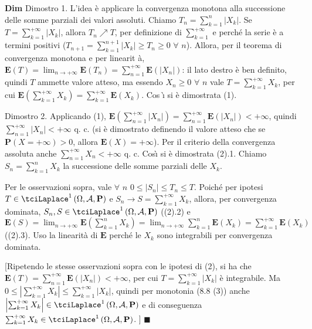 \documentclass{article}
\begin{document}
\textbf{Dim} Dimostro 1. L'idea \`{e} applicare la convergenza monotona alla
successione delle somme parziali dei valori assoluti. Chiamo $%
T_{n}=\sum_{k=1}^{n}\left\vert X_{k}\right\vert $. Se $T=\sum_{k=1}^{+\infty
}\left\vert X_{k}\right\vert $, allora $T_{n}\nearrow T$, per definizione di 
$\sum_{k=1}^{+\infty }$ e perch\'{e} la serie \`{e} a termini positivi ($%
T_{n+1}=\sum_{k=1}^{n+1}\left\vert X_{k}\right\vert \geq T_{n}\geq 0$ $%
\forall $ $n$). Allora, per il teorema di convergenza monotona e per linearit%
\`{a}, $\mathbf{E}\left( T\right) =\lim_{n\rightarrow +\infty }\mathbf{E}%
\left( T_{n}\right) =\sum_{n=1}^{+\infty }\mathbf{E}\left( \left\vert
X_{n}\right\vert \right) $: il lato destro \`{e} ben definito, quindi $T$
ammette valore atteso, ma essendo $X_{n}\geq 0$ $\forall $ $n$ vale $%
T=\sum_{k=1}^{+\infty }X_{k}$, per cui $\mathbf{E}\left( \sum_{k=1}^{+\infty
}X_{k}\right) =\sum_{k=1}^{+\infty }\mathbf{E}\left( X_{k}\right) $. Cos%
\`{\i} si \`{e} dimostrata (1).

Dimostro 2. Applicando (1), $\mathbf{E}\left( \sum_{n=1}^{+\infty
}\left\vert X_{n}\right\vert \right) =\sum_{n=1}^{+\infty }\mathbf{E}\left(
\left\vert X_{n}\right\vert \right) <+\infty $, quindi $\sum_{n=1}^{+\infty
}\left\vert X_{n}\right\vert <+\infty $ q. c. (si \`{e} dimostrato definendo
il valore atteso che se $\mathbf{P}\left( X=+\infty \right) >0$, allora $%
\mathbf{E}\left( X\right) =+\infty $). Per il criterio della convergenza
assoluta anche $\sum_{n=1}^{+\infty }X_{n}<+\infty $ q. c. Cos\`{\i} si \`{e}
dimostrata (2).1. Chiamo $S_{n}=\sum_{k=1}^{n}X_{k}$ la successione delle
somme parziali delle $X_{k}$.

Per le osservazioni sopra, vale $\forall $ $n$ $0\leq \left\vert
S_{n}\right\vert \leq T_{n}\leq T$. Poich\'{e} per ipotesi $T\in \tciLaplace
^{1}\left( \Omega ,\mathcal{A},\mathbf{P}\right) $ e $S_{n}\rightarrow
S=\sum_{k=1}^{+\infty }X_{k}$, allora, per convergenza dominata, $S_{n},S\in
\tciLaplace ^{1}\left( \Omega ,\mathcal{A},\mathbf{P}\right) $ ((2).2) e $%
\mathbf{E}\left( S\right) =\lim_{n\rightarrow +\infty }\mathbf{E}\left(
\sum_{k=1}^{n}X_{k}\right) =\lim_{n\rightarrow +\infty }\sum_{k=1}^{n}%
\mathbf{E}\left( X_{k}\right) =\sum_{k=1}^{+\infty }\mathbf{E}\left(
X_{k}\right) $ ((2).3). Uso la linearit\`{a} di $\mathbf{E}$ perch\'{e} le $%
X_{k}$ sono integrabili per convergenza dominata.

[Ripetendo le stesse osservazioni sopra con le ipotesi di (2), si ha che $%
\mathbf{E}\left( T\right) =\sum_{n=1}^{+\infty }\mathbf{E}\left( \left\vert
X_{n}\right\vert \right) <+\infty $, per cui $T=\sum_{k=1}^{+\infty
}\left\vert X_{k}\right\vert $ \`{e} integrabile. Ma $0\leq \left\vert
\sum_{k=1}^{+\infty }X_{k}\right\vert \leq \sum_{k=1}^{+\infty }\left\vert
X_{k}\right\vert $, quindi per monotonia (8.8 (3)) anche $\left\vert
\sum_{k=1}^{+\infty }X_{k}\right\vert \in \tciLaplace ^{1}\left( \Omega ,%
\mathcal{A},\mathbf{P}\right) $ e di conseguenza $\sum_{k=1}^{+\infty
}X_{k}\in \tciLaplace ^{1}\left( \Omega ,\mathcal{A},\mathbf{P}\right) $. ] $%
\blacksquare $
\end{document}
